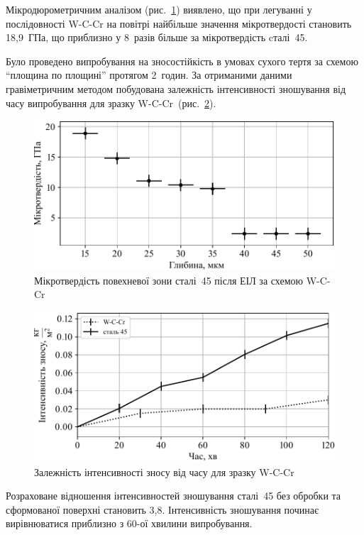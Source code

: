 \documentclass[a4paper,fontsize=14bp,ukrainian]{extreport}
\begin{document}
Мікродюрометричним аналізом (рис.~\ref{fig:plt_hard_W-C-Cr}) виявлено, що при легуванні у послідовності W-C-Cr на повітрі найбільше значення мікротвердості становить 18,9~ГПа, що приблизно у 8~разів більше за мікротвердість cталі~45.

Було проведено  випробування на зносостійкість в умовах сухого тертя за схемою ``площина по площині'' протягом 2~годин. За отриманими даними гравіметричним методом побудована залежність інтенсивності зношування від часу випробування для зразку W-C-Cr~(рис.~\ref{fig:plt_wear_W-C-Cr}).

\begin{figure}[H]
\centering  \includegraphics[]{plt_hard_W-C-Cr.pdf}
\caption{Мікротвердість повехневої зони сталі~45 після ЕІЛ за схемою W-C-Cr}
\label{fig:plt_hard_W-C-Cr}
\end{figure}

\begin{figure}[H]
\centering
\includegraphics[]{plt_wear_W-C-Cr.pdf}
\caption{Залежність інтенсивності зносу від часу для зразку W-C-Cr}
\label{fig:plt_wear_W-C-Cr}
\end{figure}

Розраховане відношення інтенсивностей зношування сталі~45 без обробки та сформованої поверхні становить 3,8. Інтенсивність зношування починає вирівнюватися приблизно з 60-ої хвилини випробування.
\end{document}
